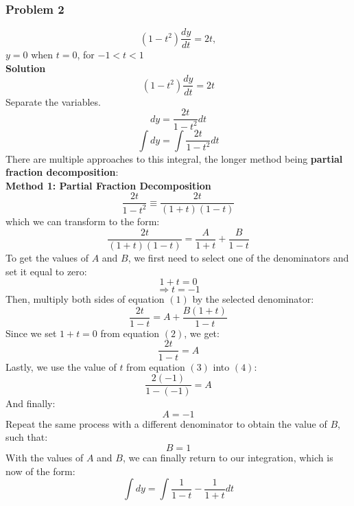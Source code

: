 \documentclass[hidelinks, a4paper, 12pt]{article}
\begin{document}
            \subsubsection{Problem 2}
                \[(1-t^2)\frac{dy}{dt} = 2t,\]
                $y = 0$ when $t = 0$, for $-1 < t < 1$\\[\baselineskip]
                \textbf{Solution}
                \[(1-t^2)\frac{dy}{dt} = 2t\]
                Separate the variables.
                \[dy = \frac{2t}{1-t^2}dt\]
                \[\int dy = \int \frac{2t}{1-t^2}dt\]
                There are multiple approaches to this integral, the longer method being \textbf{partial fraction decomposition}:\\[\baselineskip]
                \textbf{Method 1: Partial Fraction Decomposition}
                    \[\frac{2t}{1-t^2} \equiv \frac{2t}{(1+t)(1-t)}\]
                    which we can transform to the form:
                    \begin{equation}
                        \frac{2t}{(1+t)(1-t)} = \frac{A}{1+t} + \frac{B}{1-t}
                    \end{equation}
                    To get the values of $A$ and $B$, we first need to select one of the denominators and set it equal to zero:
                    \begin{equation}
                        1+t = 0   
                    \end{equation}
                    \begin{equation}
                        \Rightarrow t = -1
                    \end{equation}
                    Then, multiply both sides of equation $(1)$ by the selected denominator:
                    \[\frac{2t}{1-t} = A + \frac{B(1+t)}{1-t}\]
                    Since we set $1+t = 0$ from equation $(2)$, we get:
                    \begin{equation}
                        \frac{2t}{1-t} = A
                    \end{equation}
                    Lastly, we use the value of $t$ from equation $(3)$ into $(4)$:
                    \[\frac{2(-1)}{1-(-1)} = A\]
                    And finally:
                    \[A = -1\]
                    Repeat the same process with a different denominator to obtain the value of $B$, such that:
                    \[B = 1\]
                    With the values of $A$ and $B$, we can finally return to our integration, which is now of the form:
                    \[\int dy = \int \frac{1}{1-t} - \frac{1}{1+t}dt\]
\end{document}
